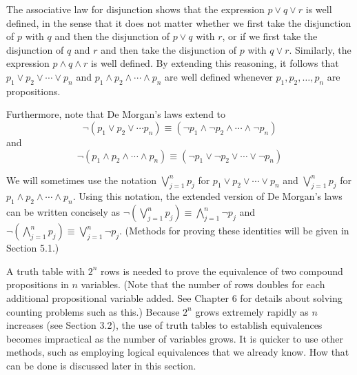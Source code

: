\documentclass{Axon}
\begin{document}
The associative law for disjunction shows that the expression \(p \lor q \lor r\) is well defined, in the sense that it does not matter whether we first take the disjunction of \(p\) with \(q\) and then the disjunction of \(p \lor q\) with \(r\), or if we first take the disjunction of \(q\) and \(r\) and then take the disjunction of \(p\) with \(q \lor r\). Similarly, the expression \(p \land q \land r\) is well defined. By extending this reasoning, it follows that \(p_1 \lor p_2 \lor \cdots \lor p_n\) and \(p_1 \land p_2 \land \cdots \land p_n\) are well defined whenever \(p_1, p_2, \ldots, p_n\) are propositions.

Furthermore, note that De Morgan's laws extend to
\begin{equation*}
    \lnot (p_1 \lor p_2 \lor \cdots p_n) \equiv (\lnot p_1 \land \lnot p_2 \land \cdots \land \lnot p_n)
\end{equation*}
and
\begin{equation*}
    \lnot (p_1 \land p_2 \land \cdots \land p_n) \equiv (\lnot p_1 \lor \lnot p_2 \lor \cdots \lor \lnot p_n)
\end{equation*}

We will sometimes use the notation \(\bigvee_{j = 1}^n p_j\) for \(p_1 \lor p_2 \lor \cdots \lor p_n\) and \(\bigvee_{j = 1}^n p_j\) for \(p_1 \land p_2 \land \cdots \land p_n\). Using this notation, the extended version of De Morgan's laws can be written concisely as \(\lnot \left(\bigvee_{j = 1}^n p_j\right) \equiv \bigwedge_{j = 1}^n \lnot p_j\) and \(\lnot\left(\bigwedge_{j = 1}^n p_j\right) \equiv \bigvee_{j = 1}^n \lnot p_j\). (Methods for proving these identities will be given in Section 5.1.)

A truth table with \(2^n\) rows is needed to prove the equivalence of two compound propositions in \(n\) variables. (Note that the number of rows doubles for each additional propositional variable added. See Chapter 6 for details about solving counting problems such as this.) Because \(2^n\) grows extremely rapidly as \(n\) increases (see Section 3.2), the use of truth tables to establish equivalences becomes impractical as the number of variables grows. It is quicker to use other methods, such as employing logical equivalences that we already know. How that can be done is discussed later in this section.

\printbibliography
\end{document}
